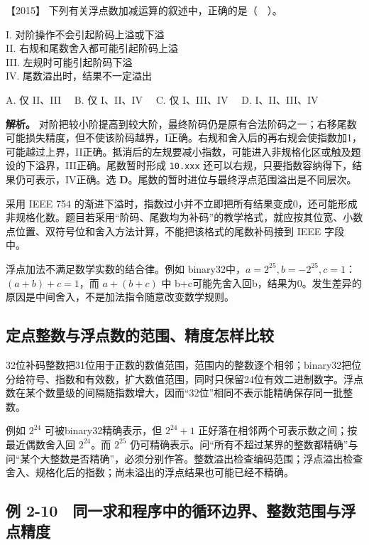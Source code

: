 \noindent{}【2015】 下列有关浮点数加减运算的叙述中，正确的是（　）。

I. 对阶操作不会引起阶码上溢或下溢\\
II. 右规和尾数舍入都可能引起阶码上溢\\
III. 左规时可能引起阶码下溢\\
IV. 尾数溢出时，结果不一定溢出

A. 仅 II、III　 B. 仅 I、II、IV　 C. 仅 I、III、IV　 D. I、II、III、IV


\textbf{解析。} 对阶把较小阶提高到较大阶，最终阶码仍是原有合法阶码之一；右移尾数可能损失精度，但不使该阶码越界，I正确。右规和舍入后的再右规会使指数加1，可能越过上界，II正确。抵消后的左规要减小指数，可能进入非规格化区或触及题设的下溢界，III正确。尾数暂时形成 \allowbreak{}\texttt{10.xxx} 还可以右规，只要指数容纳得下，结果仍可表示，IV正确。选 \textbf{D}。尾数的暂时进位与最终浮点范围溢出是不同层次。

采用 IEEE 754 的渐进下溢时，指数过小并不立即把所有结果变成0，还可能形成非规格化数。题目若采用``阶码、尾数均为补码''的教学格式，就应按其位宽、小数点位置、双符号位和舍入方法计算，不能把该格式的尾数补码接到 IEEE 字段中。

浮点加法不满足数学实数的结合律。例如 binary32中，\(a=2^{25},b=-2^{25},c=1\)：\((a+b)+c=1\)，而 \(a+(b+c)\) 中 b+c可能先舍入回b，结果为0。发生差异的原因是中间舍入，不是加法指令随意改变数学规则。

\subsection{定点整数与浮点数的范围、精度怎样比较}\label{co-c02-h270}

32位补码整数把31位用于正数的数值范围，范围内的整数逐个相邻；binary32把位分给符号、指数和有效数，扩大数值范围，同时只保留24位有效二进制数字。浮点数在某个数量级的间隔随指数增大，因而``32位''相同不表示能精确保存同一批整数。

例如 \(2^{24}\) 可被binary32精确表示，但 \(2^{24}+1\) 正好落在相邻两个可表示数之间；按最近偶数舍入回 \(2^{24}\)。而 \(2^{25}\) 仍可精确表示。问``所有不超过某界的整数都精确''与问``某个大整数是否精确''，必须分别作答。整数溢出检查编码范围；浮点溢出检查舍入、规格化后的指数；尚未溢出的浮点结果也可能已经不精确。

\subsection{例 2-10　同一求和程序中的循环边界、整数范围与浮点精度}\label{co-ex2-10}


